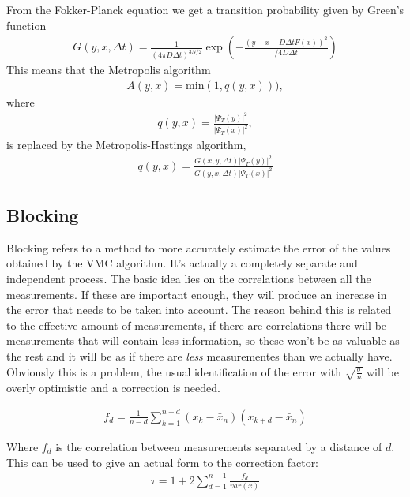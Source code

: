 \documentclass[11pt]{article}
\begin{document}
		From the Fokker-Planck equation we get a transition probability given
		by Green's function
		\begin{align}
			G(y,x,\Delta t)=\frac{1}{(4\pi D\Delta t)^{3N/2}}\exp{\left(-\frac{(y-x-D\Delta tF(x))^{2}}{/4D\Delta t}\right)}
		\end{align}
		This means that the Metropolis algorithm
		\begin{align}
			A(y,x)=\mathrm{min}(1,q(y,x))),
		\end{align}
		where
		\begin{align}
			q(y,x)=\frac{|\Psi_{T}(y)|^{2}}{|\Psi_{T}(x)|^{2}},
		\end{align}
		is replaced by the Metropolis-Hastings algorithm,
		\begin{align}
			q(y,x)=\frac{G(x,y,\Delta t)|\Psi_{T}(y)|^{2}}{G(y,x,\Delta t)|\Psi_{T}(x)|^{2}}
		\end{align}

	\subsection{Blocking}
		Blocking refers to a method to more accurately estimate the error of the values obtained by the VMC algorithm. It's actually a completely separate and independent process. The basic idea lies on the correlations between all the measurements. If these are important enough, they will produce an increase in the error that needs to be taken into account. The reason behind this is related to the effective amount of measurements, if there are correlations there will be measurements that will contain less information, so these won't be as valuable as the rest and it will be as if there are \textit{less} measurementes than we actually have. Obviously this is a problem, the usual identification of the error with $\sqrt{\frac{\sigma}{n}}$ will be overly optimistic and a correction is needed.

		\begin{align}
			f_d=\frac{1}{n-d}\sum_{k=1}^{n-d}{\left(x_k-\bar{x}_n\right)\left(x_{k+d}-\bar{x}_n\right)}
		\end{align}

		Where $f_d$ is the correlation between measurements separated by a distance of $d$. This can be used to give an actual form to the correction factor:\\

		\begin{align}
			\tau=1+2\sum_{d=1}^{n-1}{\frac{f_d}{var\left(x\right)}}
		\end{align}
\end{document}
